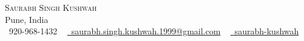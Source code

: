 \documentclass[letterpaper,11pt]{article}
\newcommand{\resumeSubHeadingListStart}{\begin{itemize}[leftmargin=0.0in, label={}]}
\newcommand{\resumeSubHeadingListEnd}{\end{itemize}}
\begin{document}

\begin{center}
    {\Huge \scshape Saurabh Singh Kushwah} \\ \vspace{1pt}
    Pune, India \\ \vspace{1pt}
    \small \raisebox{-0.1\height}
        \faPhone\ 920-968-1432 ~
        \href{mailto:saurabh.singh.kushwah.1999@gmail.com}{\raisebox{-0.2\height}\faEnvelope\ saurabh.singh.kushwah.1999@gmail.com} ~
        \href{https://linkedin.com/in/saurabh-kushwah/}{\raisebox{-0.2\height}\faLinkedin\ saurabh-kushwah}  ~
    \vspace{-8pt}
\end{center}

\end{document}
